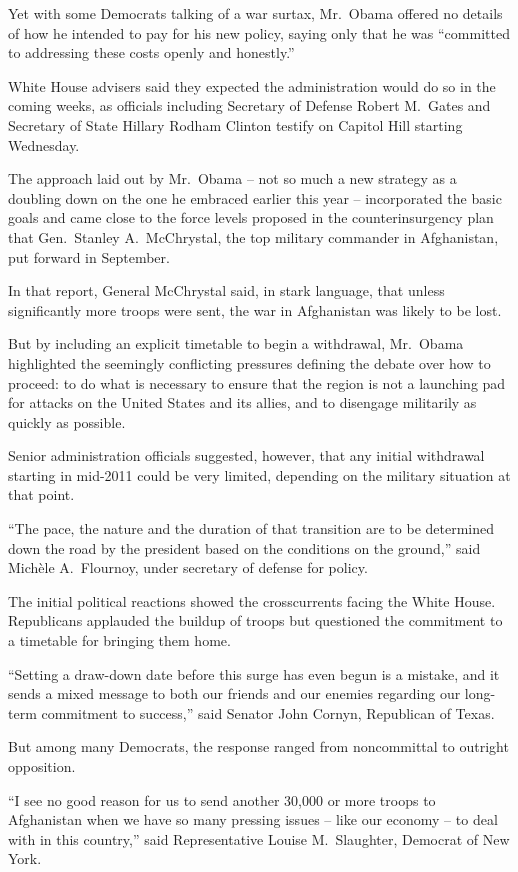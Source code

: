 ﻿\documentclass[12pt]{article}
\begin{document}
Yet with some Democrats talking of a war surtax, Mr.~Obama offered no details of how he intended to
pay for his new policy, saying only that he was ``committed to addressing these costs openly and
honestly.''

White House advisers said they expected the administration would do so in the coming weeks, as
officials including Secretary of Defense Robert M.~Gates and Secretary of State Hillary Rodham
Clinton testify on Capitol Hill starting Wednesday.

The approach laid out by Mr.~Obama -- not so much a new strategy as a doubling down on the one he
embraced earlier this year -- incorporated the basic goals and came close to the force levels
proposed in the counterinsurgency plan that Gen.~Stanley A.~McChrystal, the top military commander
in Afghanistan, put forward in September.

In that report, General McChrystal said, in stark language, that unless significantly more troops
were sent, the war in Afghanistan was likely to be lost.

But by including an explicit timetable to begin a withdrawal, Mr.~Obama highlighted the seemingly
conflicting pressures defining the debate over how to proceed: to do what is necessary to ensure
that the region is not a launching pad for attacks on the United States and its allies, and to
disengage militarily as quickly as possible.

Senior administration officials suggested, however, that any initial withdrawal starting in mid-2011
could be very limited, depending on the military situation at that point.

``The pace, the nature and the duration of that transition are to be determined down the road by the
president based on the conditions on the ground,'' said Mich\`ele A.~Flournoy, under secretary of
defense for policy.

The initial political reactions showed the crosscurrents facing the White House. Republicans
applauded the buildup of troops but questioned the commitment to a timetable for bringing them home.

``Setting a draw-down date before this surge has even begun is a mistake, and it sends a mixed
message to both our friends and our enemies regarding our long-term commitment to success,'' said
Senator John Cornyn, Republican of Texas.

But among many Democrats, the response ranged from noncommittal to outright opposition.

``I see no good reason for us to send another 30,000 or more troops to Afghanistan when we have so
many pressing issues -- like our economy -- to deal with in this country,'' said Representative
Louise M.~Slaughter, Democrat of New York.
\end{document}

